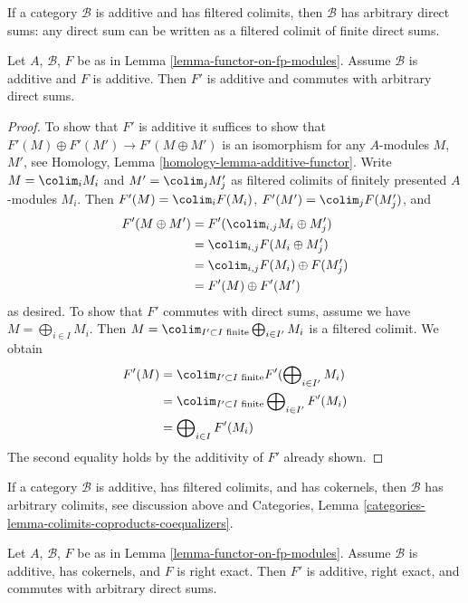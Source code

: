 \noindent
If a category $\mathcal{B}$ is additive and has filtered colimits,
then $\mathcal{B}$ has arbitrary direct sums: any direct sum can be written
as a filtered colimit of finite direct sums.

\begin{lemma}
\label{lemma-functor-on-fp-modules-additive}
Let $A$, $\mathcal{B}$, $F$ be as in Lemma \ref{lemma-functor-on-fp-modules}.
Assume $\mathcal{B}$ is additive and $F$ is additive. Then
$F'$ is additive and commutes with arbitrary direct sums.
\end{lemma}

\begin{proof}
To show that $F'$ is additive it suffices to show
that $F'(M) \oplus F'(M') \to F'(M \oplus M')$ is an isomorphism for
any $A$-modules $M$, $M'$, see
Homology, Lemma \ref{homology-lemma-additive-functor}.
Write $M = \colim_i M_i$ and $M' = \colim_j M'_j$ as filtered colimits
of finitely presented $A$-modules $M_i$. Then
$F'(M) = \colim_i F(M_i)$, $F'(M') = \colim_j F(M'_j)$, and
\begin{align*}
F'(M \oplus M')
& =
F'(\colim_{i, j} M_i \oplus M'_j) \\
& =
\colim_{i, j} F(M_i \oplus M'_j) \\
& =
\colim_{i, j} F(M_i) \oplus F(M'_j) \\
& =
F'(M) \oplus F'(M')
\end{align*}
as desired. To show that $F'$ commutes with direct sums, assume
we have $M = \bigoplus_{i \in I} M_i$. Then
$M = \colim_{I' \subset I\text{ finite}} \bigoplus_{i \in I'} M_i$
is a filtered colimit. We obtain
\begin{align*}
F'(M)
& =
\colim_{I' \subset I\text{ finite}}
F'(\bigoplus\nolimits_{i \in I'} M_i) \\
& =
\colim_{I' \subset I\text{ finite}}
\bigoplus\nolimits_{i \in I'} F'(M_i) \\
& =
\bigoplus\nolimits_{i \in I} F'(M_i)
\end{align*}
The second equality holds by the additivity of $F'$ already shown.
\end{proof}

\noindent
If a category $\mathcal{B}$ is additive, has filtered colimits, and
has cokernels, then $\mathcal{B}$ has arbitrary colimits, see
discussion above and Categories, Lemma
\ref{categories-lemma-colimits-coproducts-coequalizers}.

\begin{lemma}
\label{lemma-functor-on-fp-modules-right-exact}
Let $A$, $\mathcal{B}$, $F$ be as in Lemma \ref{lemma-functor-on-fp-modules}.
Assume $\mathcal{B}$ is additive, has cokernels, and $F$ is right exact. Then
$F'$ is additive, right exact, and commutes with arbitrary direct sums.
\end{lemma}

